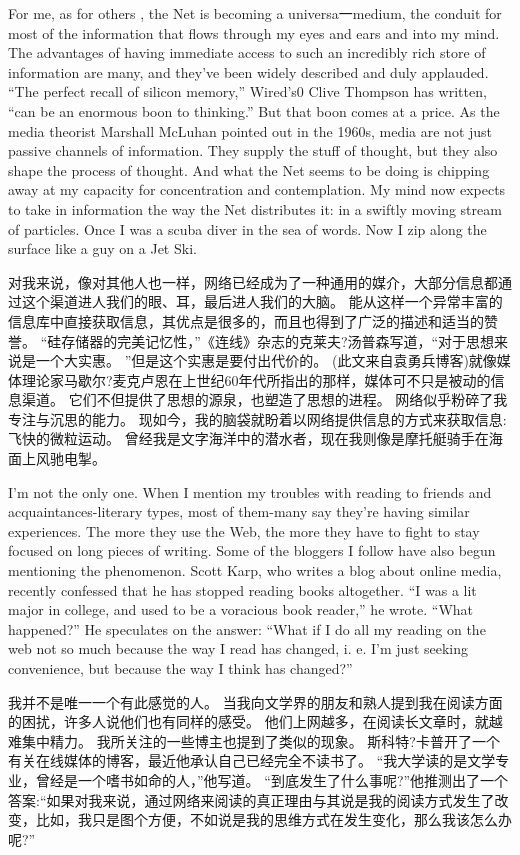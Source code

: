 \documentclass[cs4size, a4paper, 12pt]{article}
\newcounter{numpar}
\newcommand*{\newpar}{\numpar{}}
\begin{document}
	\newpar For me, as for others , the Net is becoming a universa一medium, the conduit for most of the information that flows through my eyes and ears and into my mind. The advantages of having immediate access to such an incredibly rich store of information are many, and they've been widely described and duly applauded. ``The perfect recall of silicon memory,'' Wired's0 Clive Thompson has written, ``can be an enormous boon to thinking.'' But that boon comes at a price. As the media theorist Marshall McLuhan pointed out in the 1960s, media are not just passive channels of information. They supply the stuff of thought, but they also shape the process of thought. And what the Net seems to be doing is chipping away at my capacity for concentration and contemplation. My mind now expects to take in information the way the Net distributes it: in a swiftly moving stream of particles. Once I was a scuba diver in the sea of words. Now I zip along the surface like a guy on a Jet Ski.
	
	对我来说，像对其他人也一样，网络已经成为了一种通用的媒介，大部分信息都通过这个渠道进人我们的眼、耳，最后进人我们的大脑。 能从这样一个异常丰富的信息库中直接获取信息，其优点是很多的，而且也得到了广泛的描述和适当的赞誉。 ``硅存储器的完美记忆性，''《连线》杂志的克莱夫?汤普森写道，``对于思想来说是一个大实惠。 ''但是这个实惠是要付出代价的。 (此文来自袁勇兵博客)就像媒体理论家马歇尔?麦克卢恩在上世纪60年代所指出的那样，媒体可不只是被动的信息渠道。 它们不但提供了思想的源泉，也塑造了思想的进程。 网络似乎粉碎了我专注与沉思的能力。 现如今，我的脑袋就盼着以网络提供信息的方式来获取信息:飞快的微粒运动。 曾经我是文字海洋中的潜水者，现在我则像是摩托艇骑手在海面上风驰电掣。 
	
	\newpar I’m not the only one. When I mention my troubles with reading to friends and acquaintances-literary types, most of them-many say they're having similar experiences. The more they use the Web, the more they have to fight to stay focused on long pieces of writing. Some of the bloggers I follow have also begun mentioning the phenomenon. Scott Karp, who writes a blog about online media, recently confessed that he has stopped reading books altogether. ``I was a lit major in college, and used to be a voracious book reader,'' he wrote. ``What happened?'' He speculates on the answer: ``What if I do all my reading on the web not so much because the way I read has changed, i. e. I'm just seeking convenience, but because the way I think has changed?''
	
	我并不是唯一一个有此感觉的人。 当我向文学界的朋友和熟人提到我在阅读方面的困扰，许多人说他们也有同样的感受。 他们上网越多，在阅读长文章时，就越难集中精力。 我所关注的一些博主也提到了类似的现象。 斯科特?卡普开了一个有关在线媒体的博客，最近他承认自己已经完全不读书了。  ``我大学读的是文学专业，曾经是一个嗜书如命的人，''他写道。 ``到底发生了什么事呢?''他推测出了一个答案:``如果对我来说，通过网络来阅读的真正理由与其说是我的阅读方式发生了改变，比如，我只是图个方便，不如说是我的思维方式在发生变化，那么我该怎么办呢?''
	
\end{document}
